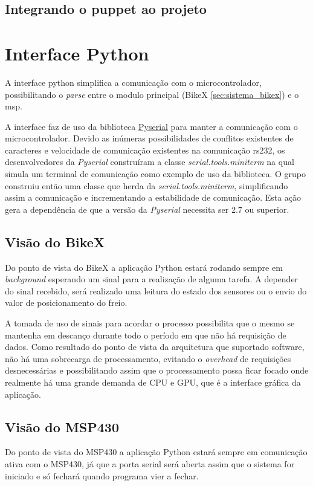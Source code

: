 \subsection{Integrando o puppet ao projeto} %
\label{sub:integrando_o_puppet_ao_projeto}


\section{Interface Python} %
\label{sec:interface_python}

A interface \gls{python} simplifica a comunicação com o microcontrolador, possibilitando o \textit{parse} entre o modulo principal (BikeX \ref{sec:sistema_bikex}) e o \gls{msp}.

A interface faz de uso da biblioteca \href{http://pyserial.sourceforge.net/pyserial.html}{Pyserial} para manter a comunicação com o microcontrolador. Devido as inúmeras possibilidades de conflitos existentes de caracteres e velocidade de comunicação existentes na comunicação \gls{rs232}, os desenvolvedores da \textit{Pyserial} construíram a classe \textit{serial.tools.miniterm} na qual simula um terminal de comunicação como exemplo de uso da biblioteca. O grupo construiu então uma classe que herda da \textit{serial.tools.miniterm}, simplificando assim a comunicação e incrementando a estabilidade de comunicação. Esta ação gera a dependência de que a versão da \textit{Pyserial} necessita ser 2.7 ou superior.

\subsection{Visão do BikeX} %
\label{sub:vis_o_do_bikex}

Do ponto de vista do BikeX a aplicação Python estará rodando sempre em \textit{background} esperando um sinal para a realização de alguma tarefa. A depender do sinal recebido, será realizado uma leitura do estado dos sensores ou o envio do valor de posicionamento do freio.

A tomada de uso de sinais para acordar o processo possibilita que o mesmo se mantenha em descanço durante todo o período em que não há requisição de dados. Como resultado do ponto de vista da arquitetura que suportado software, não há uma sobrecarga de processamento, evitando o \textit{overhead} de requisições desnecessárias e possibilitando assim que o processamento possa ficar focado onde realmente há uma grande demanda de CPU e GPU, que é a interface gráfica da aplicação.

\subsection{Visão do MSP430} %
\label{sub:vis_o_do_msp430}

Do ponto de vista do MSP430 a aplicação Python estará sempre em comunicação ativa com o MSP430, já que a porta serial será aberta assim que o sistema for iniciado e só fechará quando programa vier a fechar.
